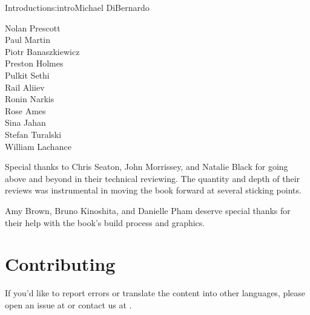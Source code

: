 \begin{aosachapter}{Introduction}{s:intro}{Michael DiBernardo}
\begin{multicols}{3}
Nolan Prescott \\
Paul Martin \\
Piotr Banaszkiewicz \\
Preston Holmes \\
Pulkit Sethi \\
Rail Aliiev \\
Ronin Narkis \\
Rose Ames \\
Sina Jahan \\
Stefan Turalski \\
William Lachance \\
\end{multicols}

\newpage  %

\noindent Special thanks to Chris Seaton, John Morrissey, and Natalie Black for going above and beyond in their technical reviewing. The quantity and depth of their reviews was instrumental in moving the book forward at several sticking points.

Amy Brown, Bruno Kinoshita, and Danielle Pham deserve special thanks
for their help with the book's build process and graphics.


\section*{Contributing}

If you'd like to report errors or translate the content into other languages,
please open an issue at  or contact us at
.

\end{aosachapter}
